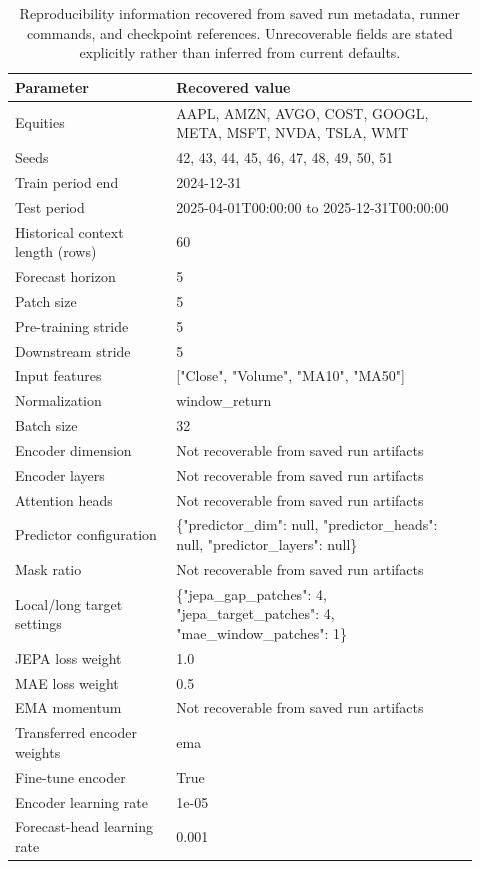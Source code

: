 \begin{table}[p]
\centering
\small
\caption{Reproducibility information recovered from saved run metadata, runner commands, and checkpoint references. Unrecoverable fields are stated explicitly rather than inferred from current defaults.}
\label{tab:reproducibility}
\begin{tabular}{p{0.32\linewidth}p{0.60\linewidth}}
\toprule
Parameter & Recovered value \\
\midrule
Equities & AAPL, AMZN, AVGO, COST, GOOGL, META, MSFT, NVDA, TSLA, WMT \\
Seeds & 42, 43, 44, 45, 46, 47, 48, 49, 50, 51 \\
Train period end & 2024-12-31 \\
Test period & 2025-04-01T00:00:00 to 2025-12-31T00:00:00 \\
Historical context length (rows) & 60 \\
Forecast horizon & 5 \\
Patch size & 5 \\
Pre-training stride & 5 \\
Downstream stride & 5 \\
Input features & ["Close", "Volume", "MA10", "MA50"] \\
Normalization & window\_return \\
Batch size & 32 \\
Encoder dimension & Not recoverable from saved run artifacts \\
Encoder layers & Not recoverable from saved run artifacts \\
Attention heads & Not recoverable from saved run artifacts \\
Predictor configuration & \{"predictor\_dim": null, "predictor\_heads": null, "predictor\_layers": null\} \\
Mask ratio & Not recoverable from saved run artifacts \\
Local/long target settings & \{"jepa\_gap\_patches": 4, "jepa\_target\_patches": 4, "mae\_window\_patches": 1\} \\
JEPA loss weight & 1.0 \\
MAE loss weight & 0.5 \\
EMA momentum & Not recoverable from saved run artifacts \\
Transferred encoder weights & ema \\
Fine-tune encoder & True \\
Encoder learning rate & 1e-05 \\
Forecast-head learning rate & 0.001 \\

\end{tabular}
\end{table}
